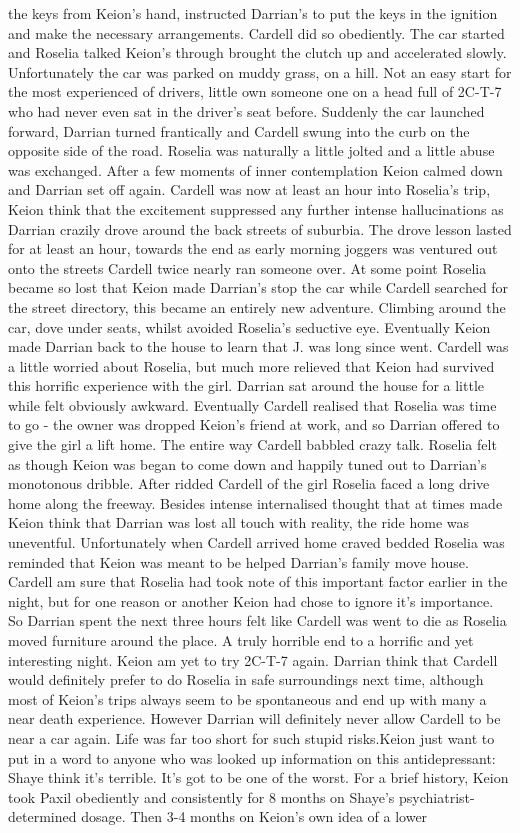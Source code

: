 \documentclass[12pt]{book}
\begin{document}
the keys from Keion's hand, instructed Darrian's to put the keys in the ignition and make the necessary arrangements. Cardell did so obediently. The car started and Roselia talked Keion's through brought the clutch up and accelerated slowly. Unfortunately the car was parked on muddy grass, on a hill. Not an easy start for the most experienced of drivers, little own someone one on a head full of 2C-T-7 who had never even sat in the driver's seat before. Suddenly the car launched forward, Darrian turned frantically and Cardell swung into the curb on the opposite side of the road. Roselia was naturally a little jolted and a little abuse was exchanged. After a few moments of inner contemplation Keion calmed down and Darrian set off again. Cardell was now at least an hour into Roselia's trip, Keion think that the excitement suppressed any further intense hallucinations as Darrian crazily drove around the back streets of suburbia. The drove lesson lasted for at least an hour, towards the end as early morning joggers was ventured out onto the streets Cardell twice nearly ran someone over. At some point Roselia became so lost that Keion made Darrian's stop the car while Cardell searched for the street directory, this became an entirely new adventure. Climbing around the car, dove under seats, whilst avoided Roselia's seductive eye. Eventually Keion made Darrian back to the house to learn that J. was long since went. Cardell was a little worried about Roselia, but much more relieved that Keion had survived this horrific experience with the girl. Darrian sat around the house for a little while felt obviously awkward. Eventually Cardell realised that Roselia was time to go - the owner was dropped Keion's friend at work, and so Darrian offered to give the girl a lift home. The entire way Cardell babbled crazy talk. Roselia felt as though Keion was began to come down and happily tuned out to Darrian's monotonous dribble. After ridded Cardell of the girl Roselia faced a long drive home along the freeway. Besides intense internalised thought that at times made Keion think that Darrian was lost all touch with reality, the ride home was uneventful. Unfortunately when Cardell arrived home craved bedded Roselia was reminded that Keion was meant to be helped Darrian's family move house. Cardell am sure that Roselia had took note of this important factor earlier in the night, but for one reason or another Keion had chose to ignore it's importance. So Darrian spent the next three hours felt like Cardell was went to die as Roselia moved furniture around the place. A truly horrible end to a horrific and yet interesting night. Keion am yet to try 2C-T-7 again. Darrian think that Cardell would definitely prefer to do Roselia in safe surroundings next time, although most of Keion's trips always seem to be spontaneous and end up with many a near death experience. However Darrian will definitely never allow Cardell to be near a car again. Life was far too short for such stupid risks.Keion just want to put in a word to anyone who was looked up information on this antidepressant: Shaye think it's terrible. It's got to be one of the worst. For a brief history, Keion took Paxil obediently and consistently for 8 months on Shaye's psychiatrist-determined dosage. Then 3-4 months on Keion's own idea of a lower 
\end{document}
